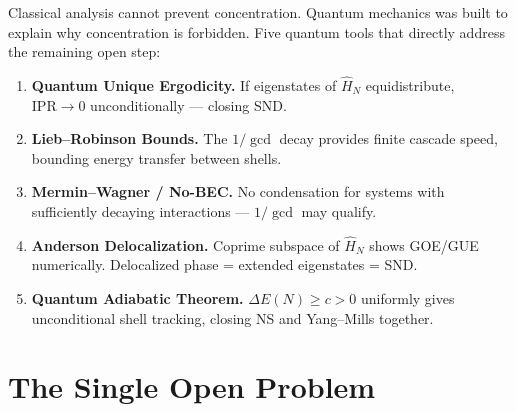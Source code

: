 \documentclass[12pt]{article}
\begin{document}
Classical analysis cannot prevent concentration.
Quantum mechanics was built to explain why concentration is forbidden.
Five quantum tools that directly address the remaining open step:

\begin{enumerate}[label=\textbf{\arabic*.},leftmargin=2cm,itemsep=4pt]
  \item \textbf{Quantum Unique Ergodicity.}
        If eigenstates of $\hat{H}_N$ equidistribute,
        $\mathrm{IPR}\to0$ unconditionally --- closing SND.

  \item \textbf{Lieb--Robinson Bounds.}
        The $1/\gcd$ decay provides finite cascade speed,
        bounding energy transfer between shells.

  \item \textbf{Mermin--Wagner / No-BEC.}
        No condensation for systems with sufficiently decaying
        interactions --- $1/\gcd$ may qualify.

  \item \textbf{Anderson Delocalization.}
        Coprime subspace of $\hat{H}_N$ shows GOE/GUE numerically.
        Delocalized phase = extended eigenstates = SND.

  \item \textbf{Quantum Adiabatic Theorem.}
        $\Delta E(N) \ge c > 0$ uniformly gives unconditional
        shell tracking, closing NS and Yang--Mills together.
\end{enumerate}

\section{The Single Open Problem}
\label{sec:open}
\end{document}
